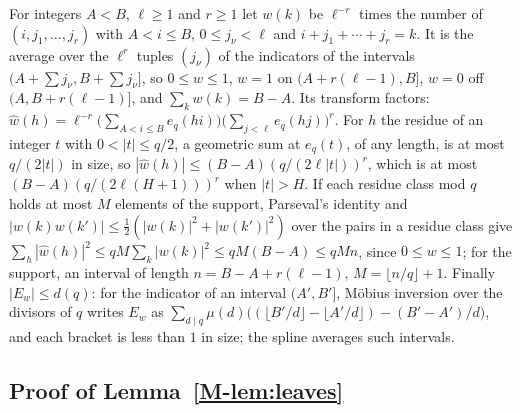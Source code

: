 \documentclass[11pt]{article}
\numberwithin{equation}{section}
\begin{document}
For integers $A < B$, $\ell \ge 1$ and $r \ge 1$ let $w(k)$ be $\ell^{-r}$ times the number of $(i, j_1, \dots, j_r)$
with $A < i \le B$, $0 \le j_\nu < \ell$ and $i + j_1 + \cdots + j_r = k$. It is the average over the $\ell^r$ tuples
$(j_\nu)$ of the indicators of the intervals $(A + \sum j_\nu, B + \sum j_\nu]$, so $0 \le w \le 1$, $w = 1$ on $(A +
r(\ell - 1), B]$, $w = 0$ off $(A, B + r(\ell - 1)]$, and $\sum_k w(k) = B - A$. Its transform factors: $\hat w(h) =
\ell^{-r} \bigl(\sum_{A < i \le B} e_q(hi)\bigr) \bigl(\sum_{j < \ell} e_q(hj)\bigr)^r$. For $h$ the residue of an
integer $t$ with $0 < |t| \le q/2$, a geometric sum at $e_q(t)$, of any length, is at most $q/(2|t|)$ in size, so $|\hat
w(h)| \le (B - A)(q/(2\ell|t|))^r$, which is at most $(B - A)(q/(2\ell(H + 1)))^r$ when $|t| > H$. If each residue class
mod $q$ holds at most $M$ elements of the support, Parseval's identity and $|w(k) w(k')| \le \tfrac12(|w(k)|^2 +
|w(k')|^2)$ over the pairs in a residue class give $\sum_h |\hat w(h)|^2 \le qM \sum_k |w(k)|^2 \le qM(B - A) \le qMn$,
since $0 \le w \le 1$; for the support, an interval
of length $n = B - A + r(\ell - 1)$, $M = \lfloor n/q \rfloor + 1$. Finally $|E_w| \le d(q)$: for the indicator of an
interval $(A', B']$, Möbius inversion over the divisors of $q$ writes $E_w$ as $\sum_{d \mid q} \mu(d)\bigl((\lfloor
B'/d \rfloor - \lfloor A'/d \rfloor) - (B' - A')/d\bigr)$, and each bracket is less than $1$ in size; the spline
averages such intervals.

\subsection*{Proof of Lemma~\ref{M-lem:leaves}}
\end{document}
